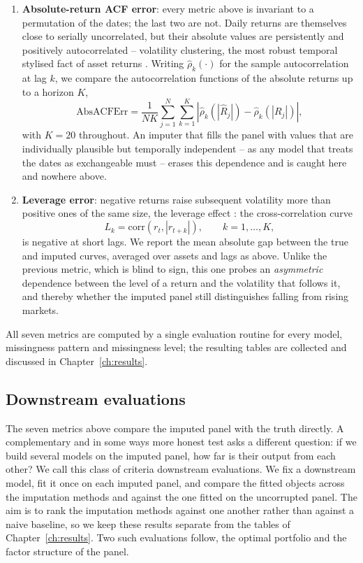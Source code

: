 \begin{enumerate}
    \item \textbf{Absolute-return ACF error}: every metric above is
    invariant to a permutation of the dates; the last two are not. Daily
    returns are themselves close to serially uncorrelated, but their
    absolute values are persistently and positively autocorrelated --
    volatility clustering, the most robust temporal stylised fact of asset
    returns \citep{cont2001}. Writing $\hat{\rho}_k(\cdot)$ for the sample
    autocorrelation at lag $k$, we compare the autocorrelation functions of
    the absolute returns up to a horizon $K$,
    \[
    \mathrm{AbsACFErr}
    = \frac{1}{NK} \sum_{j=1}^{N} \sum_{k=1}^{K}
      \left| \hat{\rho}_k\!\left(|\widehat{R}_j|\right)
           - \hat{\rho}_k\!\left(|R_j|\right) \right| ,
    \]
    with $K = 20$ throughout. An imputer that fills the panel with values
    that are individually plausible but temporally independent -- as any
    model that treats the dates as exchangeable must -- erases this
    dependence and is caught here and nowhere above.

    \item \textbf{Leverage error}: negative returns raise subsequent
    volatility more than positive ones of the same size, the leverage
    effect \citep{black1976}: the cross-correlation curve
    \[
    L_k = \mathrm{corr}\!\left( r_{t}, |r_{t+k}| \right),
    \qquad k = 1, \dots, K ,
    \]
    is negative at short lags. We report the mean absolute gap between the
    true and imputed curves, averaged over assets and lags as above. Unlike
    the previous metric, which is blind to sign, this one probes an
    \emph{asymmetric} dependence between the level of a return and the
    volatility that follows it, and thereby whether the imputed panel still
    distinguishes falling from rising markets.
\end{enumerate}

All seven metrics are computed by a single evaluation routine for every
model, missingness pattern and missingness level; the resulting tables are
collected and discussed in Chapter~\ref{ch:results}.

\subsection{Downstream evaluations}
\label{sec:downstream}

The seven metrics above compare the imputed panel with the truth directly. A
complementary and in some ways more honest test asks a different question: if
we build several models on the imputed panel, how far is their output from each other?
We call this class of criteria downstream
evaluations. We fix a downstream model, fit it once on each imputed panel, and
compare the fitted objects across the imputation methods and against the one
fitted on the uncorrupted panel. The aim is to rank the imputation
methods against one another rather than against a naive baseline, so we keep
these results separate from the tables of Chapter~\ref{ch:results}. Two such
evaluations follow, the optimal portfolio and the factor structure of the
panel.

